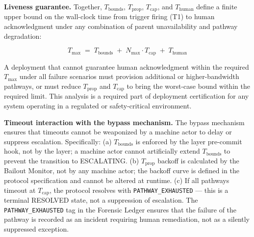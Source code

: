 \bigskip
\noindent\textbf{Liveness guarantee.} Together, $T_{\text{bounds}}$, $T_{\text{prop}}$, $T_{\text{cap}}$, and $T_{\text{human}}$ define a finite upper bound on the wall-clock time from trigger firing (T1) to human acknowledgment under any combination of parent unavailability and pathway degradation:

\begin{equation}
T_{\max} \;=\; T_{\text{bounds}} \;+\; N_{\max} \cdot T_{\text{cap}} \;+\; T_{\text{human}} \tag{T-max}
\end{equation}

A deployment that cannot guarantee human acknowledgment within the required $T_{\max}$ under all failure scenarios must provision additional or higher-bandwidth pathways, or must reduce $T_{\text{prop}}$ and $T_{\text{cap}}$ to bring the worst-case bound within the required limit. This analysis is a required part of deployment certification for any \bxthree{} system operating in a regulated or safety-critical environment.

\bigskip
\noindent\textbf{Timeout interaction with the bypass mechanism.} The bypass mechanism ensures that timeouts cannot be weaponized by a machine actor to delay or suppress escalation. Specifically: (a) $T_{\text{bounds}}$ is enforced by the \fact{} layer pre-commit hook, not by the \bounds{} layer; a machine actor cannot artificially extend $T_{\text{bounds}}$ to prevent the transition to ESCALATING. (b) $T_{\text{prop}}$ backoff is calculated by the Bailout Monitor, not by any machine actor; the backoff curve is defined in the protocol specification and cannot be altered at runtime. (c) If all pathways timeout at $T_{\text{cap}}$, the protocol resolves with \texttt{PATHWAY\_EXHAUSTED} — this is a terminal RESOLVED state, not a suppression of escalation. The \texttt{PATHWAY\_EXHAUSTED} tag in the Forensic Ledger ensures that the failure of the pathway is recorded as an incident requiring human remediation, not as a silently suppressed exception.
